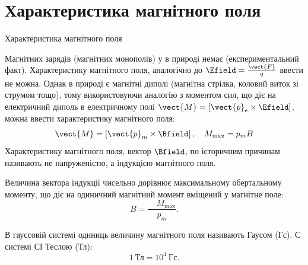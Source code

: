 \documentclass{beamer}
\begin{document}
\section{Характеристика магнітного поля}



\begin{frame}{Характеристика магнітного поля}{}
	\begin{block}{}\justifying
		Магнітних зарядів (магнітних монополів) у в природі немає (експериментальний факт). Характеристику магнітного поля, аналогічно до $\Efield =
			\frac{\vect{F}}{q}$
		ввести не можна. Однак в природі є магнітні диполі (магнітна стрілка, коловий виток зі струмом тощо), тому використовуючи аналогію з моментом
		сил, що діє на електричний диполь в електричному полі $ \vect{M} = \left[\vect{p}_e \times\Efield\right] $, можна ввести характеристику
		магнітного поля:
		\begin{equation*}
			\vect{M} = \left[\vect{p}_m \times\Bfield\right], \quad M_{\max} = p_m B
		\end{equation*}
		Характеристику магнітного поля, вектор $\Bfield$, по історичним причинам називають не \alert{напруженістю}, а \alert{індукцією} магнітного поля.
	\end{block}
	\begin{overprint}
		\begin{block}{}\justifying
			Величина вектора індукції чисельно дорівнює максимальному обертальному моменту, що діє на одиничний магнітний момент вміщений у магнітне поле:
			\begin{equation*}
				B = \frac{\quad M_{\max}}{p_m}.
			\end{equation*}
		\end{block}
		\begin{alertblock}{}\justifying
			В гауссовій системі одиниць величину магнітного поля називають Гаусом (Гс). С системі СІ Теслою (Тл):
			\begin{equation*}
				1\ \text{Тл} = 10^4\ \text{Гс}.
			\end{equation*}
		\end{alertblock}
	\end{overprint}
\end{frame}
\end{document}
